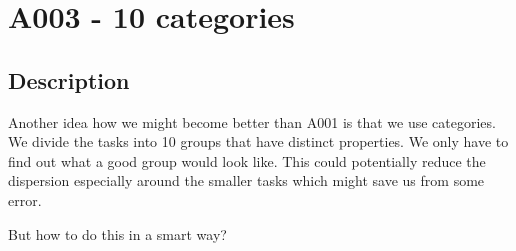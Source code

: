 \newpage{}

\hypertarget{a003---10-categories}{%
\section{A003 - 10 categories}\label{a003---10-categories}}

\hypertarget{description}{%
\subsection{Description}\label{description}}

Another idea how we might become better than A001 is that we use
categories. We divide the tasks into 10 groups that have distinct
properties. We only have to find out what a good group would look like.
This could potentially reduce the dispersion especially around the
smaller tasks which might save us from some error.

But how to do this in a smart way?
